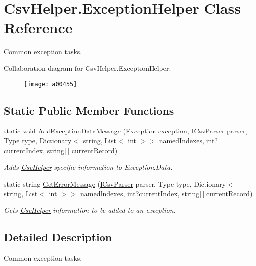 \hypertarget{a00104}{\section{Csv\-Helper.\-Exception\-Helper Class Reference}
\label{a00104}
}


Common exception tasks.  




Collaboration diagram for Csv\-Helper.\-Exception\-Helper\-:
\nopagebreak
\begin{figure}[H]
\begin{center}
\leavevmode
\texttt{[image: a00455]}
\end{center}
\end{figure}
\subsection*{Static Public Member Functions}
\begin{DoxyCompactItemize}
\item 
static void \hyperlink{a00104_a7415ea84b6d462b9d61ecf2128282837}{Add\-Exception\-Data\-Message} (Exception exception, \hyperlink{a00115}{I\-Csv\-Parser} parser, Type type, Dictionary$<$ string, List$<$ int $>$$>$ named\-Indexes, int?current\-Index, string\mbox{[}$\,$\mbox{]} current\-Record)
\begin{DoxyCompactList}\small\item\em Adds \hyperlink{a00340}{Csv\-Helper} specific information to Exception.\-Data. \end{DoxyCompactList}\item 
static string \hyperlink{a00104_a11e421dc9f9fdb2b72d060a24471b5be}{Get\-Error\-Message} (\hyperlink{a00115}{I\-Csv\-Parser} parser, Type type, Dictionary$<$ string, List$<$ int $>$$>$ named\-Indexes, int?current\-Index, string\mbox{[}$\,$\mbox{]} current\-Record)
\begin{DoxyCompactList}\small\item\em Gets \hyperlink{a00340}{Csv\-Helper} information to be added to an exception. \end{DoxyCompactList}\end{DoxyCompactItemize}


\subsection{Detailed Description}
Common exception tasks. 



